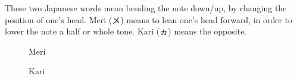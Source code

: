 ﻿These two Japanese words mean bending the note down/up, by changing the position of one’s head.
Meri (メ) means to lean one’s head forward, in order to lower the note a half or whole tone. Kari (ヵ) means the opposite.

\begin{figure}
\centering
\begin{minipage}{0.4\textwidth}
\centering
{}
\caption{Meri} \label{fig:mult2}
\end{minipage}
\hfill
\begin{minipage}{0.4\textwidth}
\centering
{}
\caption{Kari} \label{fig:mult3}
\end{minipage}
\end{figure}

